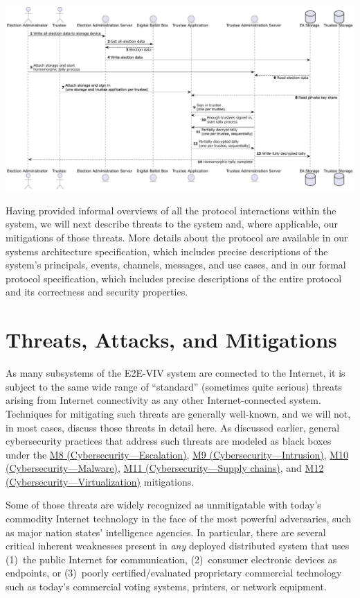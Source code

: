 \documentclass[10pt,letterpaper]{article}
\begin{document}
\includegraphics[width=\textwidth]{diagrams/seq-homomorphic-tally.pdf}

Having provided informal overviews of all the protocol interactions within the system, we will next describe threats to the system and, where applicable, our mitigations of those threats. More details about the protocol are available in our systems architecture specification, which includes precise descriptions of the system's principals, events, channels, messages, and use cases, and in our formal protocol specification, which includes precise descriptions of the entire protocol and its correctness and security properties.

\pagebreak
\section{Threats, Attacks, and Mitigations}

As many subsystems of the E2E-VIV system are connected to the Internet, it is subject to the same wide range of ``standard'' (sometimes quite serious) threats arising from Internet connectivity as any other Internet-connected system. Techniques for mitigating such threats are generally well-known, and we will not, in most cases, discuss those threats in detail here. As discussed earlier, general cybersecurity practices that address such threats are modeled as black boxes under the \hyperlink{M8}{M8 (Cybersecurity---Escalation)}, \hyperlink{M9}{M9 (Cybersecurity---Intrusion)}, \hyperlink{M10}{M10 (Cybersecurity---Malware)}, \hyperlink{M11}{M11 (Cybersecurity---Supply chains)}, and \hyperlink{M12}{M12 (Cybersecurity---Virtualization)} mitigations.

Some of those threats are widely recognized as unmitigatable with today's commodity Internet technology in the face of the most powerful adversaries, such as major nation states' intelligence agencies. In particular, there are several critical inherent weaknesses present in \emph{any} deployed distributed system that uses (1)~the public Internet for communication, (2)~consumer electronic devices as endpoints, or (3)~poorly certified/evaluated proprietary commercial technology such as today's commercial voting systems, printers, or network equipment.
\end{document}
